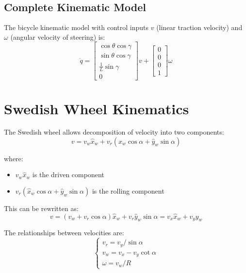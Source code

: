 \documentclass[openany]{book}
\theoremstyle{definition}
\theoremstyle{remark}
\begin{document}
\subsection{Complete Kinematic Model}
The bicycle kinematic model with control inputs $v$ (linear traction velocity) and $\omega$ (angular velocity of steering) is:
\begin{equation}
    \dot{q} = \begin{bmatrix}
        \cos\theta\cos\gamma \\
        \sin\theta\cos\gamma \\
        \frac{1}{L}\sin\gamma \\
        0
    \end{bmatrix}v + \begin{bmatrix}
        0 \\
        0 \\
        0 \\
        1
    \end{bmatrix}\omega
\end{equation}

\section{Swedish Wheel Kinematics}

The Swedish wheel allows decomposition of velocity into two components:
\begin{equation}
    v = v_w\hat{x}_w + v_r(\hat{x}_w\cos\alpha + \hat{y}_w\sin\alpha)
\end{equation}

where:
\begin{itemize}
    \item $v_w\hat{x}_w$ is the driven component
    \item $v_r(\hat{x}_w\cos\alpha + \hat{y}_w\sin\alpha)$ is the rolling component
\end{itemize}

This can be rewritten as:
\begin{equation}
    v = (v_w + v_r\cos\alpha)\hat{x}_w + v_r\hat{y}_w\sin\alpha = v_x\hat{x}_w + v_y\hat{y}_w
\end{equation}

The relationships between velocities are:
\begin{equation}
    \begin{cases}
        v_r = v_y/\sin\alpha\\
        v_w = v_x - v_y\cot\alpha\\
        \omega = v_w/R
    \end{cases}
\end{equation}
\end{document}
